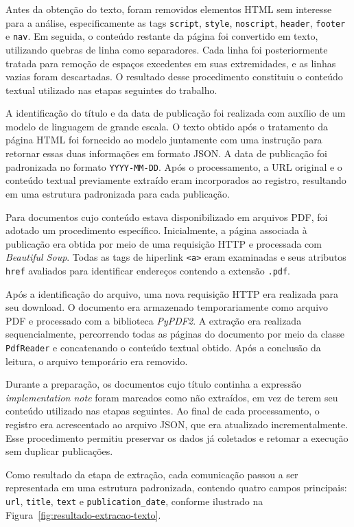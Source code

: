 Antes da obtenção do texto, foram removidos elementos HTML sem 
interesse para a análise, especificamente as tags \texttt{script}, 
\texttt{style}, \texttt{noscript}, \texttt{header}, \texttt{footer} e 
\texttt{nav}. Em seguida, o conteúdo restante da página foi convertido em 
texto, utilizando quebras de linha como separadores. Cada linha foi 
posteriormente tratada para remoção de espaços excedentes em suas extremidades, 
e as linhas vazias foram descartadas. O resultado desse procedimento constituiu 
o conteúdo textual utilizado nas etapas seguintes do trabalho.

A identificação do título e da data de publicação foi realizada com auxílio 
de um modelo de linguagem de grande escala. O texto obtido após o tratamento 
da página HTML foi fornecido ao modelo juntamente com uma instrução para 
retornar essas duas informações em formato JSON. A data de publicação 
foi padronizada no formato \texttt{YYYY-MM-DD}. Após o processamento, 
a URL original e o conteúdo textual previamente extraído eram incorporados 
ao registro, resultando em uma estrutura padronizada para cada publicação.

Para documentos cujo conteúdo estava disponibilizado em arquivos PDF, 
foi adotado um procedimento específico. Inicialmente, a página associada à 
publicação era obtida por meio de uma requisição HTTP e 
processada com \textit{Beautiful Soup}. Todas as tags de 
hiperlink \texttt{<a>} eram examinadas e seus atributos \texttt{href} avaliados 
para identificar endereços contendo a extensão \texttt{.pdf}.

Após a identificação do arquivo, uma nova requisição HTTP era realizada 
para seu download. O documento era armazenado temporariamente como arquivo 
PDF e processado com a biblioteca \textit{PyPDF2}. A extração era realizada 
sequencialmente, percorrendo todas as páginas do documento por meio 
da classe \texttt{PdfReader} e concatenando o conteúdo textual obtido. 
Após a conclusão da leitura, o arquivo temporário era removido.

Durante a preparação, os documentos cujo título continha a expressão
\textit{implementation note} foram marcados como não extraídos, em vez de terem seu
conteúdo utilizado nas etapas seguintes. Ao final de cada processamento, o registro
era acrescentado ao arquivo JSON, que era atualizado incrementalmente. Esse
procedimento permitiu preservar os dados já coletados e retomar a execução sem
duplicar publicações.

Como resultado da etapa de extração, cada comunicação passou a ser representada
em uma estrutura padronizada, contendo quatro campos principais: 
\texttt{url}, \texttt{title}, \texttt{text} e \texttt{publication\_date}, 
conforme ilustrado
na Figura~\ref{fig:resultado-extracao-texto}.

